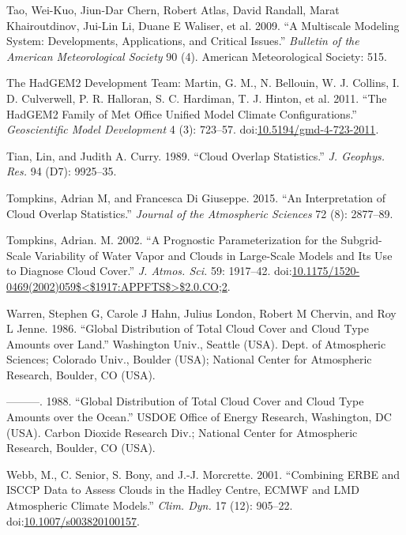 \hypertarget{ref-taoux5fetux5falux5f2009}{}
Tao, Wei-Kuo, Jiun-Dar Chern, Robert Atlas, David Randall, Marat
Khairoutdinov, Jui-Lin Li, Duane E Waliser, et al. 2009. ``A Multiscale
Modeling System: Developments, Applications, and Critical Issues.''
\emph{Bulletin of the American Meteorological Society} 90 (4). American
Meteorological Society: 515.

\hypertarget{ref-martinux5fetux5falux5f2011}{}
The HadGEM2 Development Team: Martin, G. M., N. Bellouin, W. J. Collins,
I. D. Culverwell, P. R. Halloran, S. C. Hardiman, T. J. Hinton, et al.
2011. ``The HadGEM2 Family of Met Office Unified Model Climate
Configurations.'' \emph{Geoscientific Model Development} 4 (3): 723--57.
doi:\href{https://doi.org/10.5194/gmd-4-723-2011}{10.5194/gmd-4-723-2011}.

\hypertarget{ref-tianux5fandux5fcurryux5f1989}{}
Tian, Lin, and Judith A. Curry. 1989. ``Cloud Overlap Statistics.''
\emph{J. Geophys. Res.} 94 (D7): 9925--35.

\hypertarget{ref-tompkinsux5fandux5fdigiuseppeux5f2015}{}
Tompkins, Adrian M, and Francesca Di Giuseppe. 2015. ``An Interpretation
of Cloud Overlap Statistics.'' \emph{Journal of the Atmospheric
Sciences} 72 (8): 2877--89.

\hypertarget{ref-tompkinsux5f2002}{}
Tompkins, Adrian. M. 2002. ``A Prognostic Parameterization for the
Subgrid-Scale Variability of Water Vapor and Clouds in Large-Scale
Models and Its Use to Diagnose Cloud Cover.'' \emph{J. Atmos. Sci.} 59:
1917--42.
doi:\href{https://doi.org/10.1175/1520-0469(2002)059$\%3C$1917:APPFTS$\%3E$2.0.CO;2}{10.1175/1520-0469(2002)059\$\textless{}\$1917:APPFTS\$\textgreater{}\$2.0.CO;2}.

\hypertarget{ref-warrenux5fetux5falux5f1986}{}
Warren, Stephen G, Carole J Hahn, Julius London, Robert M Chervin, and
Roy L Jenne. 1986. ``Global Distribution of Total Cloud Cover and Cloud
Type Amounts over Land.'' Washington Univ., Seattle (USA). Dept. of
Atmospheric Sciences; Colorado Univ., Boulder (USA); National Center for
Atmospheric Research, Boulder, CO (USA).

\hypertarget{ref-warrenux5fetux5falux5f1988}{}
---------. 1988. ``Global Distribution of Total Cloud Cover and Cloud
Type Amounts over the Ocean.'' USDOE Office of Energy Research,
Washington, DC (USA). Carbon Dioxide Research Div.; National Center for
Atmospheric Research, Boulder, CO (USA).

\hypertarget{ref-webbux5fetux5falux5f2001}{}
Webb, M., C. Senior, S. Bony, and J.-J. Morcrette. 2001. ``Combining
ERBE and ISCCP Data to Assess Clouds in the Hadley Centre, ECMWF and LMD
Atmospheric Climate Models.'' \emph{Clim. Dyn.} 17 (12): 905--22.
doi:\href{https://doi.org/10.1007/s003820100157}{10.1007/s003820100157}.

